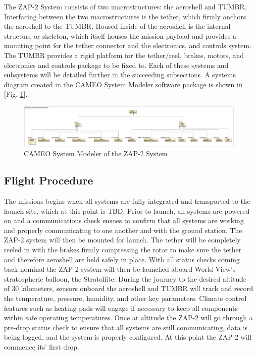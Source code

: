 The ZAP-2 System consists of two macrostructures: the aeroshell and TUMBR. Interfacing between the two macrostructures is the tether, which firmly anchors the aeroshell to the TUMBR. Housed inside of the aeroshell is the internal structure or skeleton, which itself houses the mission payload and provides a mounting point for the tether connector and the electronics, and controls system. The TUMBR provides a rigid platform for the tether/reel, brakes, motors, and electronics and controls package to be fixed to. Each of these systems and subsystems will be detailed further in the succeeding subsections. A systems diagram created in the CAMEO System Modeler software package is shown in [Fig. \ref{fig:CAMEO}]. 

\begin{figure}[ht]
  \centering
  \includegraphics[width=.8\textwidth]{Figures/Stupid.png}
  \caption{\label{fig:CAMEO}CAMEO System Modeler of the ZAP-2 System}
\end{figure}

\subsection{Flight Procedure}

\indent\indent The missions begins when all systems are fully integrated and transported to the launch site, which at this point is TBD. Prior to launch, all systems are powered on and a communications check ensues to confirm that all systems are working and properly communicating to one another and with the ground station. The ZAP-2 system will then be mounted for launch. The tether will be completely reeled in with the brakes firmly compressing the rotor to make sure the tether and therefore aeroshell are held safely in place. With all status checks coming back nominal the ZAP-2 system will then be launched aboard World View's stratospheric balloon, the Stratollite. During the journey to the desired altitude of 30 kilometers, sensors onboard the aeroshell and TUMBR will track and record the temperature, pressure, humidity, and other key parameters. Climate control features such as heating pads will engage if necessary to keep all components within safe operating temperatures. Once at altitude the ZAP-2 will go through a pre-drop status check to ensure that all systems are still communicating, data is being logged, and the system is properly configured. At this point the ZAP-2 will commence its' first drop. 

